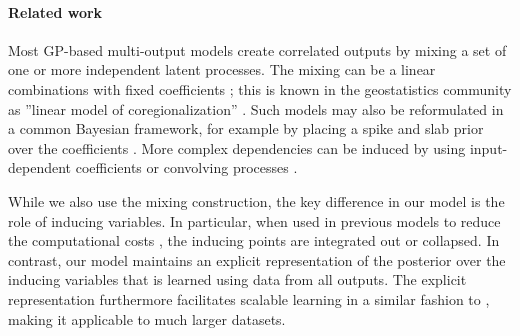 
\paragraph{Related work}
Most GP-based multi-output models create correlated outputs by mixing a set of one or more independent latent processes.
The mixing can be a linear combinations with fixed coefficients \citep[see e.g.][]{teh-et-al-aistats-05,bonilla-et-al-nips-08}; this is known in the geostatistics community as ''linear model of coregionalization'' \citep{goovaerts1997geostatistics}.
Such models may also be reformulated in a common Bayesian framework, for example by placing a spike and slab prior over the coefficients \citep{titsias2011spike}.
More complex dependencies can be induced by using 
 input-dependent coefficients \citep{wilson-et-al-icml-12,nguyen2013efficient}  or convolving processes \citep{boyle-frean-nips-05,alvarez-lawrence-nips-08,alvarez2010efficient}.
 
While we also use the mixing construction, the key difference in our model is the role of inducing variables.
In particular, when used in previous models to reduce the computational costs \citep[see e.g.][]{alvarez-lawrence-nips-08,alvarez2010efficient}, the inducing points are integrated out or collapsed. 
In contrast, our model maintains an explicit representation of the posterior over the inducing variables that is learned using data from all outputs.
The explicit representation furthermore facilitates scalable learning in a similar fashion to \citep{hensmangaussian}, making it applicable to much larger datasets. 
